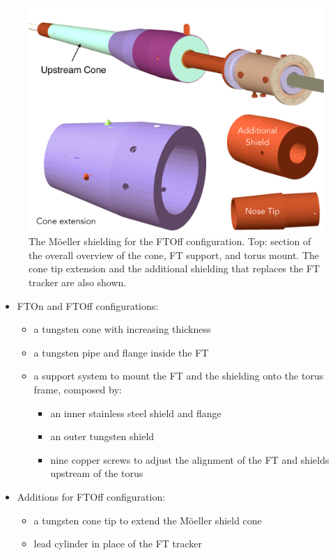 \begin{figure}
	\centering
	\includegraphics[width=0.99\columnwidth,keepaspectratio]{img/moellerShieldingFTOff.png}
   \caption{The M\"oeller shielding for the FTOff configuration. Top: section of the overall overview of the cone, FT support, and torus mount.
            The cone tip extension and the additional shielding that replaces the FT tracker are also shown.}
	\label{fig:moellerShieldingFTOff}
\end{figure}



\begin{itemize}
	\item FTOn and FTOff configurations:
	\begin{itemize}
		\item a tungsten cone with increasing thickness
		\item a tungsten pipe and flange inside the FT
		\item a support system to mount the FT and the shielding onto the torus frame, composed by:
		\begin{itemize}
			\item an inner stainless steel shield and flange
			\item an outer tungsten shield
			\item nine copper screws to adjust the alignment of the FT and shields upstream of the torus
		\end{itemize}
	\end{itemize}
	\item Additions for FTOff configuration:
	\begin{itemize}
	\item a tungsten cone tip to extend the M\"oeller shield cone
	\item lead cylinder in place of the FT tracker
	\end{itemize}

\end{itemize}




